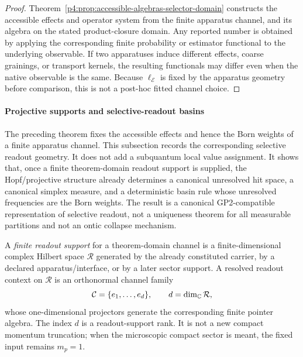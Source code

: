 \documentclass[12pt,a4paper]{article}
\begin{document}
\begin{proof}
Theorem~\ref{p4:prop:accessible-algebras-selector-domain} constructs the accessible effects and operator system from the finite apparatus channel, and its algebra on the stated product-closure domain.  Any reported number is obtained by applying the corresponding finite probability or estimator functional to the underlying observable.  If two apparatuses induce different effects, coarse grainings, or transport kernels, the resulting functionals may differ even when the native observable is the same.  Because \(\ell_{\mathcal E}\) is fixed by the apparatus geometry before comparison, this is not a post-hoc fitted channel choice.
\end{proof}




\paragraph{Projective supports and selective-readout basins}
\label{p4:sec:part2-projective-actualization}

The preceding theorem fixes the accessible effects and hence the Born weights of a
finite apparatus channel.  This subsection records the corresponding selective
readout geometry.  It does not add a subquantum local value assignment.  It shows
that, once a finite theorem-domain readout support is supplied, the Hopf/projective
structure already determines a canonical unresolved hit space, a canonical simplex
measure, and a deterministic basin rule whose unresolved frequencies are the Born
weights.  The result is a canonical GP2-compatible representation of selective
readout, not a uniqueness theorem for all measurable partitions and not an ontic
collapse mechanism.

\begin{definition}
\label{p4:def:finite-readout-support}
A \emph{finite readout support} for a theorem-domain channel is a finite-dimensional
complex Hilbert space \(\mathcal R\) generated by the already constituted carrier,
by a declared apparatus/interface, or by a later sector support.  A resolved
readout context on \(\mathcal R\) is an orthonormal channel family
\[
        \mathcal C=\{e_1,\ldots,e_d\},
        \qquad d=\dim_{\mathbb{C}}\mathcal R,
\]
whose one-dimensional projectors generate the corresponding finite pointer
algebra.  The index \(d\) is a readout-support rank.  It is not a new compact
momentum truncation; when the microscopic compact sector is meant, the fixed
input remains \(m_p=1\).
\end{definition}
\end{document}
